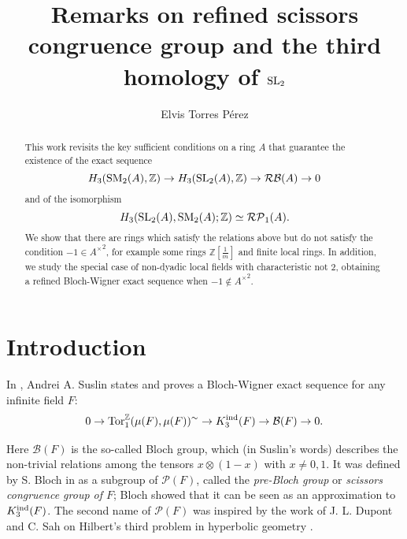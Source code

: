 \documentclass[11pt]{amsart}
\theoremstyle{definition}
\theoremstyle{plain}
\numberwithin{equation}{section}
\newcommand{\z}{\mathbb{Z}}
\newcommand{\C}{\mathbb{C}}
\newcommand{\BB}{\mathcal{B}}
\newcommand{\PP}{\mathcal{P}}
\newcommand{\RP}{\mathcal{RP}}
\newcommand{\RB}{\mathcal{RB}}
\renewcommand{\aa}{{A^\times}}
\newcommand{\tors}{{{\rm Tor}_1^{\z}}}
\newcommand{\mth}[1]{\left[ \frac{1}{#1} \right]}
\newcommand{\SL}{\mathit{{\rm SL}}}
\newcommand{\SM}{\mathit{{\rm SM}}}
\newcommand{\ind}{{\rm ind}}
\begin{document}
\title{Remarks on refined scissors congruence group and the third homology of \texorpdfstring{$\SL_2$}{Lg}}
\author{Elvis Torres P\'erez}
\address{\sf 
Department of Sciences, Pontifical Catholic University of Peru (PUCP), 
Lima, Peru}

\begin{abstract}
This work revisits the key sufficient conditions on a ring $A$ that guarantee the existence of the exact sequence
\[
    H_3(\SM_2(A),\z)\to H_3(\SL_2(A),\z)\to\RB(A)\to 0
\]
and of the isomorphism 
\[
    H_3(\SL_2(A),\SM_2(A);\z)\simeq\RP_1(A).
\]
We show that there are rings which satisfy the relations above but do not satisfy the condition $-1\in\aa^2$, for example some rings $\z\mth{m}$ and finite local rings. In addition, we study the special case of non-dyadic local fields with characteristic not 2, obtaining a refined Bloch-Wigner exact sequence when $-1\notin\aa^2$.
\end{abstract}
\maketitle
\section{Introduction}
In \cite{suslin1991}, Andrei A. Suslin states and proves a Bloch-Wigner exact sequence for any infinite field $F$: 
\begin{equation}\label{sus-BW-seq}
    0\to\tors(\mu(F),\mu(F))^\sim \to K^\ind_3(F)\to \BB(F)\to 0.    
\end{equation}

Here $\BB(F)$ is the so-called Bloch group, which (in Suslin's words) describes the non-trivial relations among the tensors $x\otimes(1-x)$ with $x\neq 0,1$. It was defined by S. Bloch in \cite{bloch2000} as a subgroup of $\PP(F)$, called the {\it pre-Bloch group} or {\it scissors congruence group of $F$}; Bloch showed that it can be seen as an approximation to $K_3^\ind(F)$. The second name of $\PP(F)$ was inspired by the work of J. L. Dupont and C. Sah on Hilbert's third problem in hyperbolic geometry \cite{dupont-sah1982}.
\end{document}
